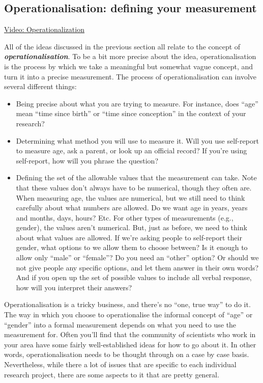 \documentclass[
]{book}
\providecommand{\tightlist}{%
  \setlength{\itemsep}{0pt}\setlength{\parskip}{0pt}}
\begin{document}
\hypertarget{operationalisation-defining-your-measurement}{%
\subsection{Operationalisation: defining your measurement}\label{operationalisation-defining-your-measurement}}

\href{https://youtu.be/p1zqoSSIpsg}{Video: Operationalization}

All of the ideas discussed in the previous section all relate to the concept of \textbf{\emph{operationalisation}}. To be a bit more precise about the idea, operationalisation is the process by which we take a meaningful but somewhat vague concept, and turn it into a precise measurement. The process of operationalisation can involve several different things:

\begin{itemize}
\tightlist
\item
  Being precise about what you are trying to measure. For instance, does ``age'' mean ``time since birth'' or ``time since conception'' in the context of your research?
\item
  Determining what method you will use to measure it. Will you use self-report to measure age, ask a parent, or look up an official record? If you're using self-report, how will you phrase the question?
\item
  Defining the set of the allowable values that the measurement can take. Note that these values don't always have to be numerical, though they often are. When measuring age, the values are numerical, but we still need to think carefully about what numbers are allowed. Do we want age in years, years and months, days, hours? Etc. For other types of measurements (e.g., gender), the values aren't numerical. But, just as before, we need to think about what values are allowed. If we're asking people to self-report their gender, what options to we allow them to choose between? Is it enough to allow only ``male'' or ``female''? Do you need an ``other'' option? Or should we not give people any specific options, and let them answer in their own words? And if you open up the set of possible values to include all verbal response, how will you interpret their answers?
\end{itemize}

Operationalisation is a tricky business, and there's no ``one, true way'' to do it. The way in which you choose to operationalise the informal concept of ``age'' or ``gender'' into a formal measurement depends on what you need to use the measurement for. Often you'll find that the community of scientists who work in your area have some fairly well-established ideas for how to go about it. In other words, operationalisation needs to be thought through on a case by case basis. Nevertheless, while there a lot of issues that are specific to each individual research project, there are some aspects to it that are pretty general.
\end{document}
